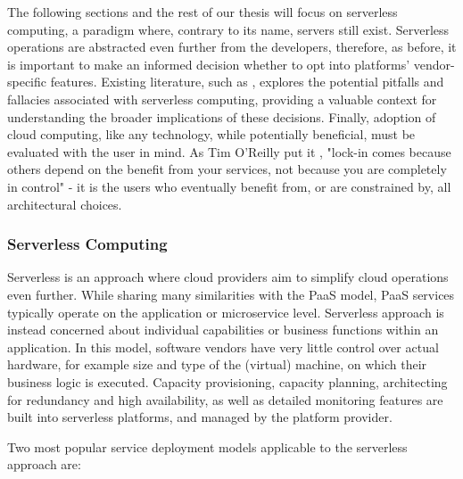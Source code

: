 The following sections and the rest of our thesis will focus on serverless computing, a paradigm where, contrary to its name, servers still exist. Serverless operations are abstracted even further from the developers, therefore, as before, it is important to make an informed decision whether to opt into platforms' vendor-specific features. Existing literature, such as \cite{jonas2019cloud-programming-simplified}, explores the potential pitfalls and fallacies associated with serverless computing, providing a valuable context for understanding the broader implications of these decisions. Finally, adoption of cloud computing, like any technology, while potentially beneficial, must be evaluated with the user in mind. As Tim O'Reilly put it \cite{o2003open-source-paradigm}, "lock-in comes because others depend on the benefit from your services, not because you are completely in control" - it is the users who eventually benefit from, or are constrained by, all architectural choices.




\subsubsection{Serverless Computing}

Serverless is an approach where cloud providers aim to simplify cloud operations even further. While sharing many similarities with the PaaS model, PaaS services typically operate on the application or microservice level. Serverless approach is instead concerned about individual capabilities or business functions within an application. In this model, software vendors have very little control over actual hardware, for example size and type of the (virtual) machine, on which their business logic is executed. Capacity provisioning, capacity planning, architecting for redundancy and high availability, as well as detailed monitoring features are built into serverless platforms, and managed by the platform provider.

Two most popular service deployment models applicable to the serverless approach are:

